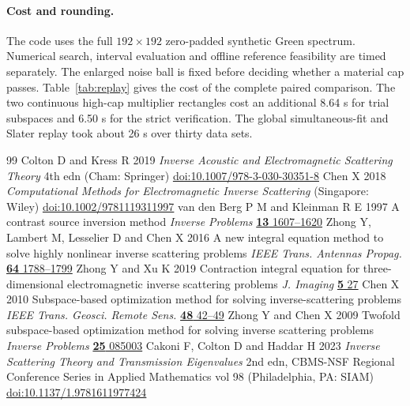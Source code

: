 \documentclass[anonymous,12pt]{iopjournal}
\theoremstyle{remark}\newtheorem{remark}[theorem]{Remark}
\numberwithin{equation}{section}
\begin{document}
\paragraph{Cost and rounding.}
The code uses the full $192\times192$ zero-padded synthetic Green spectrum. Numerical search, interval evaluation and offline reference feasibility are timed separately. The enlarged noise ball is fixed before deciding whether a material cap passes. Table~\ref{tab:replay} gives the cost of the complete paired comparison. The two continuous high-cap multiplier rectangles cost an additional 8.64 s for trial subspaces and 6.50 s for the strict verification. The global simultaneous-fit and Slater replay took about 26 s over thirty data sets. 

\FloatBarrier
\begingroup
\small
\begin{thebibliography}{99}\setlength{\itemsep}{0pt}\setlength{\parsep}{0pt}
 Colton D and Kress R 2019 \emph{Inverse Acoustic and Electromagnetic Scattering Theory} 4th edn (Cham: Springer) \href{https://doi.org/10.1007/978-3-030-30351-8}{doi:10.1007/978-3-030-30351-8}
 Chen X 2018 \emph{Computational Methods for Electromagnetic Inverse Scattering} (Singapore: Wiley) \href{https://doi.org/10.1002/9781119311997}{doi:10.1002/9781119311997}
 van den Berg P M and Kleinman R E 1997 A contrast source inversion method \emph{Inverse Problems} \href{https://doi.org/10.1088/0266-5611/13/6/013}{\textbf{13} 1607--1620}
 Zhong Y, Lambert M, Lesselier D and Chen X 2016 A new integral equation method to solve highly nonlinear inverse scattering problems \emph{IEEE Trans. Antennas Propag.} \href{https://doi.org/10.1109/TAP.2016.2535492}{\textbf{64} 1788--1799}
 Zhong Y and Xu K 2019 Contraction integral equation for three-dimensional electromagnetic inverse scattering problems \emph{J. Imaging} \href{https://doi.org/10.3390/jimaging5020027}{\textbf{5} 27}
 Chen X 2010 Subspace-based optimization method for solving inverse-scattering problems \emph{IEEE Trans. Geosci. Remote Sens.} \href{https://doi.org/10.1109/TGRS.2009.2025122}{\textbf{48} 42--49}
 Zhong Y and Chen X 2009 Twofold subspace-based optimization method for solving inverse scattering problems \emph{Inverse Problems} \href{https://doi.org/10.1088/0266-5611/25/8/085003}{\textbf{25} 085003}
Cakoni F, Colton D and Haddar H 2023 \emph{Inverse Scattering Theory and Transmission Eigenvalues} 2nd edn, CBMS-NSF Regional Conference Series in Applied Mathematics vol 98 (Philadelphia, PA: SIAM) \href{https://doi.org/10.1137/1.9781611977424}{doi:10.1137/1.9781611977424}

\end{thebibliography}
\end{document}
